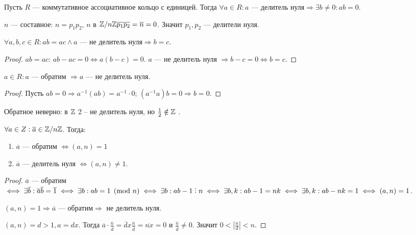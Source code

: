 \begin{definition}
    Пусть $R$ --- коммутативное ассоциативное кольцо с единицей. Тогда  $\forall a \in R: a\text{ --- делитель нуля} \Rightarrow \exists b \neq 0: ab = 0$.
\end{definition}
\begin{example}
    $n$ --- составное: $n=p_1p_2$, $n$ в $\mathbb{Z} / n\mathbb{Z} \overline{p_1 p_2}=\overline{n}=0$. Значит $p_1,p_2$ --- делители нуля.
\end{example}
\begin{lemma}
    $\forall a, b, c \in R\!: ab = ac \land a\text{ --- не делитель нуля} \Rightarrow b = c$. 
\end{lemma}
\begin{proof}
    $ab=ac$:  $ab - ac = 0 \iff a(b-c) = 0$.  $a$ --- не делитель нуля  $\Rightarrow b-c=0 \iff b = c$.
\end{proof}
\begin{lemma}
    $a \in R\!: a$ --- обратим $\Rightarrow a$ --- не делитель нуля.
\end{lemma}
\begin{proof}
    Пусть $ab=0 \Rightarrow a^{-1}(ab) = a^{-1} \cdot 0$; $(a^{-1}a)b = 0 \Rightarrow b =0$.
\end{proof}
\begin{remark}
    Обратное неверно: в $\mathbb{Z}$ 2 -- не делитель нуля, но  $\frac{1}{2} \notin \mathbb{Z}$ .
\end{remark}
\begin{theorem}
    $\forall a \in Z: \overline{a} \in \mathbb{Z} / n\mathbb{Z}$. Тогда:  
    \begin{enumerate}
        \item $\overline{a}$ --- обратим $\iff (a, n) = 1$
        \item  $\overline{a}$ --- делитель нуля $\iff (a, n) \neq 1$.
    \end{enumerate}
\end{theorem}
\begin{proof}
    $\overline{a}$ --- обратим  $\iff \exists \overline{b}: \overline{a}\overline{b} = \overline{1} \iff \exists b: ab = 1 \pmod{n} \iff \exists b: ab - 1 \divby n \iff \exists b, k: ab-1=nk \iff \exists b, k: ab-nk=1 \iff (a,n)  = 1$.

    $(a, n) = 1 \Rightarrow \overline{a}\text{ --- обратим} \Rightarrow$ не делитель нуля.

    $(a, n) = d > 1, a = dx$. Тогда  $\overline{a} \cdot \frac{\overline{n}}{\overline{d}} = \overline{d}x \frac{\overline{n}}{\overline{d}} = \overline{nx} = 0$ и $\frac{\overline{n}}{\overline{d}} \neq 0$. Значит  $0 < |\frac{n}{d}| < n$.
\end{proof}

